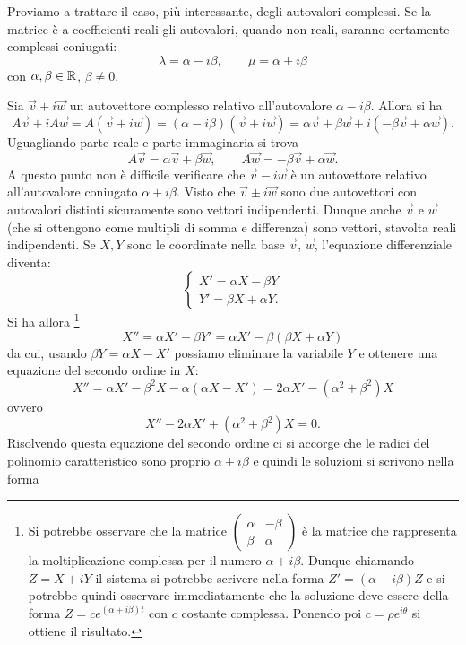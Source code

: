 Proviamo a trattare il caso, più interessante,
degli autovalori complessi. Se la matrice è a coefficienti
reali gli autovalori, quando
non reali, saranno certamente complessi coniugati:
\[
  \lambda = \alpha - i \beta,
  \qquad
  \mu = \alpha + i \beta
\]
con $\alpha,\beta\in \mathbb R$, $\beta\neq 0$.

Sia $\vec v + i \vec w$ un autovettore complesso relativo
all'autovalore $\alpha - i \beta$.
Allora si ha
\[
 A\vec v + i A \vec w
 = A(\vec v + i \vec w)
 = (\alpha - i \beta)(\vec v + i \vec w)
 = \alpha \vec v + \beta \vec w +i(-\beta \vec v + \alpha \vec w).
\]
Uguagliando parte reale e parte immaginaria si trova
\[
  A \vec v = \alpha \vec v + \beta \vec w,
  \qquad
  A \vec w = -\beta \vec v + \alpha \vec w.
\]
A questo punto non è difficile verificare che $\vec v - i \vec w$
è un autovettore relativo all'autovalore coniugato $\alpha + i\beta$.
Visto che $\vec v\pm i\vec w$ sono due autovettori con autovalori
distinti sicuramente sono vettori indipendenti.
Dunque anche $\vec v$ e $\vec w$
(che si ottengono come multipli di somma e differenza)
sono vettori, stavolta reali
indipendenti.
Se $X,Y$ sono le coordinate nella base $\vec v$, $\vec w$, l'equazione
differenziale diventa:
\[
\begin{cases}
 X' = \alpha X - \beta Y \\
 Y' = \beta X + \alpha Y.
\end{cases}
\]
Si ha allora%
\footnote{Si potrebbe osservare che la matrice
$\begin{pmatrix}\alpha&-\beta\\ \beta & \alpha\end{pmatrix}$
è la matrice che rappresenta la moltiplicazione
complessa per il numero $\alpha + i\beta$. Dunque chiamando $Z=X+iY$
il sistema si potrebbe scrivere nella forma $Z'=(\alpha +i\beta)Z$
e si potrebbe quindi osservare immediatamente
che la soluzione deve essere della forma $Z = c e^{(\alpha+i\beta)t}$
con $c$ costante complessa. Ponendo poi $c=\rho e^{i\theta}$
si ottiene il risultato.}
\[
 X'' = \alpha X' - \beta Y'
 = \alpha X' - \beta (\beta X + \alpha Y)
\]
da cui, usando $\beta Y = \alpha X - X'$ possiamo eliminare la variabile $Y$
e ottenere una equazione del secondo ordine in $X$:
\[
 X'' = \alpha X' - \beta^2 X - \alpha (\alpha X - X')
  = 2 \alpha X' - (\alpha^2+\beta^2) X
\]
ovvero
\[
 X'' - 2 \alpha X' + (\alpha^2 + \beta^2) X = 0.
\]
Risolvendo questa equazione del secondo ordine ci si accorge
che le radici del polinomio caratteristico sono proprio $\alpha \pm i \beta$
e quindi le soluzioni si scrivono nella forma
